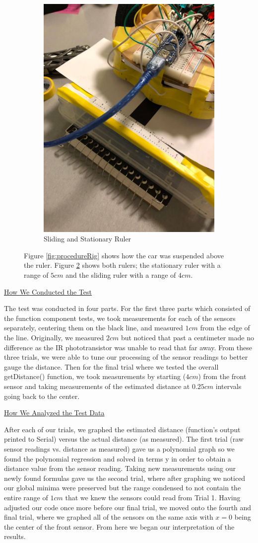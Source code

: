 \documentclass[twocolumn]{article}
\newcommand{\rpm}{\raisebox{.2ex}{$\scriptstyle\pm$}}
\newcommand{\subsectionTitle}[1]{ {\hspace{2em}\uline{#1}} \\ \vspace{1em} }
\newcommand{\textTestConduction}{The test was conducted in four parts. For the first three parts which consisted of the function component tests, we took measurements for each of the sensors separately, centering them on the black line, and measured \rpm$1cm$ from the edge of the line. Originally, we measured \rpm$2cm$ but noticed that past a centimeter made no difference as the IR phototransistor was unable to read that far away. From these three trials, we were able to tune our processing of the sensor readings to better gauge the distance. Then for the final trial where we tested the overall getDistance() function, we took measurements by starting (\rpm$4cm$) from the front sensor and taking measurements of the estimated distance at $0.25cm$ intervals going back to the center.
}
\newcommand{\textTestAnalysis}{After each of our trials, we graphed the estimated distance (function’s output printed to Serial) versus the actual distance (as measured). The first trial (raw sensor readings vs. distance as measured) gave us a polynomial graph so we found the polynomial regression and solved in terms y in order to obtain a distance value from the sensor reading. Taking new measurements using our newly found formulas gave us the second trial, where after graphing we noticed our global minima were preserved but the range condensed to not contain the entire range of \rpm$1cm$ that we knew the sensors could read from Trial 1. Having adjusted our code once more before our final trial, we moved onto the fourth and final trial, where we graphed all of the sensors on the same axis with $x=0$ being the center of the front sensor. From here we began our interpretation of the results.
}
\begin{document}
\begin{flushleft}
\begin{figure}[!H]
{\begin{subfigure}[b]{0.45\textwidth}
					\includegraphics[width=1\columnwidth, keepaspectratio]{TestProcedure_Ruler.jpg}
					\caption{Sliding and Stationary Ruler}
					\label{fig:procedureRuler}
				\end{subfigure}
				
				\caption{Figure \ref{fig:procedureRig} shows how the car was suspended above the ruler. Figure \ref{fig:procedureRuler} shows both rulers; the stationary ruler with a range of \rpm$5cm$ and the sliding ruler with a range of \rpm$4cm$.}
			}
		\end{figure}
		
		\subsectionTitle{How We Conducted the Test}

		\textTestConduction \\ \vspace{1em}
		
		\subsectionTitle{How We Analyzed the Test Data}

		\textTestAnalysis \\ \vspace{1em}
		

\end{flushleft}
\end{document}
